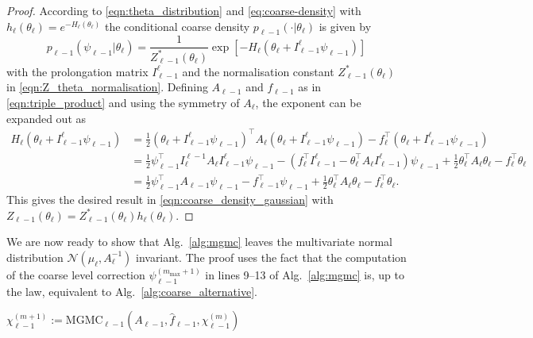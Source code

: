 \documentclass[11pt,english]{article}
\theoremstyle{plain}
\theoremstyle{plain}
\theoremstyle{plain}
\theoremstyle{plain}
\numberwithin{equation}{section}
\begin{document}
\begin{proof}
	According to \eqref{eqn:theta_distribution} and \eqref{eq:coarse-density} with $h_\ell(\theta_\ell)=e^{-H_\ell(\theta_\ell)}$ the conditional coarse density $p_{\ell-1}(\cdot|\theta_\ell)$ is given by
	\[
		p_{\ell-1}(\psi_{\ell-1}|\theta_\ell) = \frac{1}{Z^*_{\ell-1}(\theta_\ell)}\exp[-H_\ell(\theta_\ell+I_{\ell-1}^\ell\psi_{\ell-1})]
	\]
	with the prolongation matrix $I_{\ell-1}^\ell$ and the normalisation constant $Z^*_{\ell-1}(\theta_\ell)$ in \eqref{eqn:Z_theta_normalisation}. Defining $A_{\ell-1}$ and $f_{\ell-1}$ as in \eqref{eqn:triple_product} and using the symmetry of $A_\ell$, the exponent can be expanded out as
	\begin{align*}
		H_\ell(\theta_\ell+I_{\ell-1}^\ell\psi_{\ell-1}) & =
		\frac{1}{2}(\theta_\ell + I_{\ell-1}^\ell \psi_{\ell-1})^\top A_{\ell}(\theta_\ell + I_{\ell-1}^\ell\psi_{\ell-1}) - f_\ell^\top (\theta_\ell+I_{\ell-1}^\ell \psi_{\ell-1})                                                                                                                              \\
		                                                 & = \frac{1}{2}\psi_{\ell-1}^\top I_\ell^{\ell-1} A_\ell I_{\ell-1}^\ell \psi_{\ell-1} - (f_\ell^\top I_{\ell-1}^\ell- \theta_\ell^\top A_\ell I_{\ell-1}^\ell) \psi_{\ell-1} + \frac{1}{2}\theta_\ell^\top A_\ell \theta_\ell - f_\ell^\top \theta_\ell \\
		                                                 & = \frac{1}{2} \psi_{\ell-1}^\top A_{\ell-1} \psi_{\ell-1} - f_{\ell-1}^\top \psi_{\ell-1} + \frac{1}{2}\theta_\ell^\top A_{\ell}\theta_\ell - f_{\ell}^\top \theta_\ell.
	\end{align*}
	This gives the desired result in \eqref{eqn:coarse_density_gaussian} with $
		Z_{\ell-1}(\theta_\ell) = Z^*_{\ell-1}(\theta_\ell) h_\ell(\theta_\ell)$.
\end{proof}
\noindent
We are now ready to show that Alg.~\ref{alg:mgmc} leaves the multivariate normal
distribution $\mathcal{N}(\mu_\ell,A_{\ell}^{-1})$ invariant. The proof uses the fact that the computation of the coarse level correction $\psi_{\ell-1}^{(m_{\max}+1)}$ in lines 9--13 of Alg.~\ref{alg:mgmc} is, up to the law, equivalent to Alg.~\ref{alg:coarse_alternative}.
\begin{algorithm}[t!]
	\caption{Coarse level correction, alternative form. Given $f_\ell$ and $\theta_{\ell,\nu_1}$, compute $\psi_{\ell-1}^{(\gamma_\ell)}$.}\label{alg:coarse_alternative}
	\begin{algorithmic}[1]
		\State $\chi_{\ell-1}^{(m+1)}:=\mathrm{MGMC}_{\ell-1}(A_{\ell-1},\widehat{f}_{\ell-1},\chi_{\ell-1}^{(m)})$
		\EndFor
	\end{algorithmic}
\end{algorithm}
\end{document}
